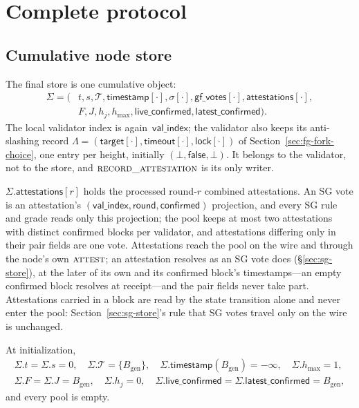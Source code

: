 \documentclass{article}
\theoremstyle{plain}
\theoremstyle{definition}
\theoremstyle{remark}
\newcommand{\genesis}{B_{\mathrm{gen}}}
\newcommand{\valindex}{\mathsf{val\_index}}
\newcommand{\round}{\mathsf{round}}
\newcommand{\confirmedf}{\mathsf{confirmed}}
\newcommand{\T}{\mathcal T}
\newcommand{\hmax}{h_{\max}}
\newcommand{\gfPool}{\mathsf{gf\_votes}}
\newcommand{\attestations}{\mathsf{attestations}}
\newcommand{\liveConfirmed}{\mathsf{live\_confirmed}}
\newcommand{\latestConfirmed}{\mathsf{latest\_confirmed}}
\newcommand{\timestamp}{\mathsf{timestamp}}
\begin{document}
\section{Complete protocol}\label{sec:complete-protocol}

\subsection{Cumulative node store}\label{sec:complete-store}

The final store is one cumulative object:
\[
\begin{split}
 \Sigma=(&t,s,\T,\timestamp[\cdot],\sigma[\cdot],
 \gfPool[\cdot],\attestations[\cdot],\\
 &F,J,h_j,\hmax,
 \liveConfirmed,\latestConfirmed).
\end{split}
\]
The local validator index is again~$\valindex$; the validator also keeps its
anti-slashing record
$\Lambda=(\mathsf{target}[\cdot],\mathsf{timeout}[\cdot],
\mathsf{lock}[\cdot])$ of Section~\ref{sec:fg-fork-choice}, one entry
per height, initially $(\bot,\mathsf{false},\bot)$.  It belongs to the
validator, not to the store, and $\Call{record\_attestation}{}$ is its
only writer.

$\Sigma.\attestations[r]$ holds the processed round-$r$ combined attestations.
An SG vote is an attestation's $(\valindex,\round,\confirmedf)$ projection,
and every SG rule and grade reads only this projection; the
pool keeps at most two attestations with distinct confirmed blocks per validator,
and attestations differing only in their pair fields are one vote.
Attestations reach the pool on the wire and through the node's own
$\Call{attest}{}$; an attestation resolves as an SG vote does
(\S\ref{sec:sg-store}), at the later of its own and its confirmed
block's timestamps---an empty confirmed block resolves at receipt---and
the pair fields never take part.
Attestations carried in a block are read by the state
transition alone and never enter the pool: Section~\ref{sec:sg-store}'s
rule that SG votes travel only on the wire is unchanged.

At initialization,
\[
 \begin{gathered}
 \Sigma.t=\Sigma.s=0,\quad \Sigma.\T=\{\genesis\},\quad
 \Sigma.\timestamp(\genesis)=-\infty,\quad \Sigma.\hmax=1,\\
 \Sigma.F=\Sigma.J=\genesis,\quad \Sigma.h_j=0,\quad
 \Sigma.\liveConfirmed=\Sigma.\latestConfirmed=\genesis,
 \end{gathered}
\]
and every pool is empty.
\end{document}
